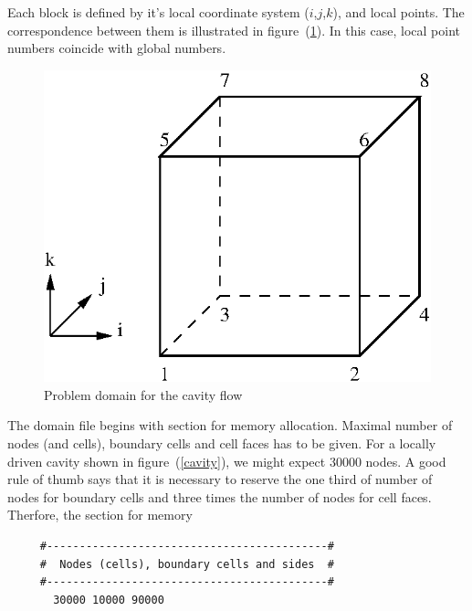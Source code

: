 \documentclass[10pt]{article}
\begin{document}
     Each block is defined by it's local coordinate system ($i$,$j$,$k$),
     and local points. The correspondence between them is 
     illustrated
     in figure~(\ref{local}). In this case, local point numbers
     coincide with global numbers.
    \begin{figure}
    \centering
    \includegraphics[scale=0.8]{local.eps}
    \caption{Problem domain for the cavity flow}
    \label{local}
    \end{figure}

     The domain file begins with section for memory allocation. Maximal number
     of nodes (and cells), boundary cells and cell faces has to be given. For
     a locally driven cavity shown in figure~(\ref{cavity}), we might expect
     $30000$ nodes. A good rule of thumb says that it is necessary to reserve the
     one third of number of nodes for boundary cells and three times 
     the number of nodes for cell faces. Therfore, the section for memory  
     \small
     \begin{verbatim}
     #-------------------------------------------#
     #  Nodes (cells), boundary cells and sides  #
     #-------------------------------------------#
       30000 10000 90000
     \end{verbatim}
     \normalsize
\end{document}

